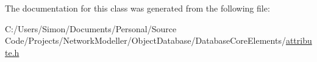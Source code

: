 The documentation for this class was generated from the following file\+:\begin{DoxyCompactItemize}
\item 
C\+:/\+Users/\+Simon/\+Documents/\+Personal/\+Source Code/\+Projects/\+Network\+Modeller/\+Object\+Database/\+Database\+Core\+Elements/\hyperlink{attribute_8h}{attribute.\+h}\end{DoxyCompactItemize}
